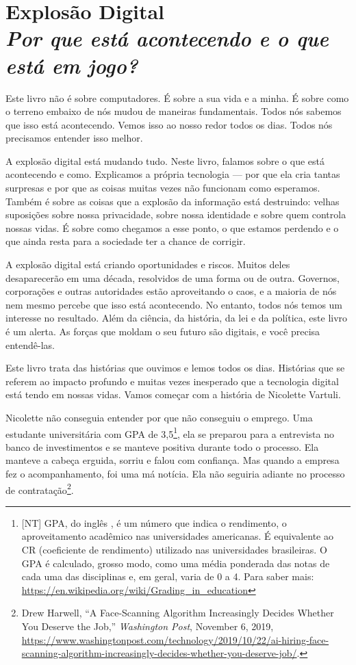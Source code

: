 \chapter[Explosão Digital]{Explosão Digital\\\large\textit{Por que está
acontecendo e o que está em jogo?}}
\label{cap1:exp-dig}

Este livro não é sobre computadores. É sobre a sua vida e a minha. É sobre como
o terreno embaixo de nós mudou de maneiras fundamentais. Todos nós sabemos que
isso está acontecendo. Vemos isso ao nosso redor todos os dias. Todos nós
precisamos entender isso melhor.

A explosão digital está mudando tudo. Neste livro, falamos sobre o que está
acontecendo e como. Explicamos a própria tecnologia --- por que ela cria tantas 
surpresas e por que as coisas muitas vezes não funcionam como esperamos. Também 
é sobre as coisas que a explosão da informação está destruindo: velhas 
suposições sobre nossa privacidade, sobre nossa identidade e sobre quem controla 
nossas vidas. É sobre como chegamos a esse ponto, o que estamos perdendo e o que 
ainda resta para a sociedade ter a chance de corrigir.

A explosão digital está criando oportunidades e riscos. Muitos deles 
desaparecerão em uma década, resolvidos de uma forma ou de outra. Governos, 
corporações e outras autoridades estão aproveitando o caos, e a maioria de nós 
nem mesmo percebe que isso está acontecendo. No entanto, todos nós temos um 
interesse no resultado. Além da ciência, da história, da lei e da política, este 
livro é um alerta. As forças que moldam o seu futuro são digitais, e você 
precisa entendê-las.

Este livro trata das histórias que ouvimos e lemos todos os dias. Histórias que 
se referem ao impacto profundo e muitas vezes inesperado que a tecnologia 
digital está tendo em nossas vidas. Vamos começar com a história de Nicolette 
Vartuli.

Nicolette não conseguia entender por que não conseguiu o emprego. Uma estudante 
universitária com GPA de 3,5\footnote{[NT] GPA, do inglês , é um número que indica o rendimento, o aproveitamento acadêmico nas
universidades americanas. É equivalente ao CR (coeficiente de rendimento)
utilizado nas universidades brasileiras. O GPA é calculado, grosso modo, como
uma média ponderada das notas de cada uma das disciplinas e, em geral, varia de
0 a 4. Para saber mais: \url{https://en.wikipedia.org/wiki/Grading_in_education}},
ela se preparou para a entrevista no banco de  investimentos e se manteve
positiva durante todo o processo. Ela manteve a cabeça erguida, sorriu e falou
com confiança. Mas quando a empresa fez o acompanhamento, foi uma má notícia.
Ela não seguiria adiante no processo de contratação\footnote{Drew Harwell, ``A
Face-Scanning Algorithm Increasingly Decides Whether You Deserve the Job,''
\textit{Washington Post}, November 6, 2019, \url{https://www.washingtonpost.com/technology/2019/10/22/ai-hiring-face-scanning-algorithm-increasingly-decides-whether-you-deserve-job/}.}.

